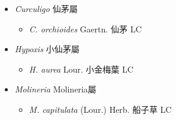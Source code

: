 
  \begin{itemize}
 \item[] \textit{Curculigo} 仙茅屬
                                
  \begin{itemize}
        \item[] \textit{C. orchioides} Gaertn.  仙茅   LC
  \end{itemize}
 \item[] \textit{Hypoxis} 小仙茅屬
                                
  \begin{itemize}
        \item[] \textit{H. aurea} Lour.  小金梅葉   LC
  \end{itemize}
 \item[] \textit{Molineria} Molineria屬
                                
  \begin{itemize}
        \item[] \textit{M. capitulata} (Lour.) Herb.  船子草   LC
  \end{itemize}
  \end{itemize}
